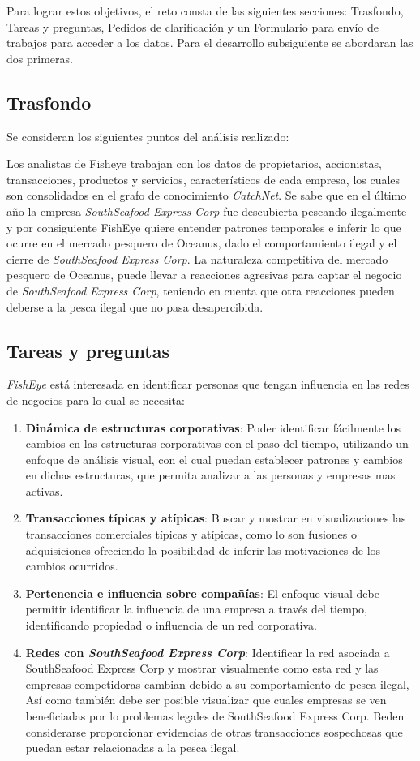 \documentclass[11pt,spanish,a4paper]{article}
\begin{document}
Para lograr estos objetivos, el reto consta de las siguientes secciones: Trasfondo, Tareas y preguntas, Pedidos de clarificación y un Formulario para envío de trabajos para acceder a los datos. Para el desarrollo subsiguiente se abordaran las dos primeras.

\subsection{Trasfondo}
Se consideran los siguientes puntos del análisis realizado:

Los analistas de Fisheye trabajan con los datos de propietarios, accionistas, transacciones, productos y servicios, característicos de cada empresa, los cuales son consolidados en el grafo de conocimiento \emph{CatchNet}. Se sabe que en el último año la empresa \emph{SouthSeafood Express Corp} fue descubierta pescando ilegalmente y por consiguiente FishEye quiere entender patrones temporales e inferir lo que ocurre en el mercado pesquero de Oceanus, dado el comportamiento ilegal y el cierre de \emph{SouthSeafood Express Corp}. La naturaleza competitiva del mercado pesquero de Oceanus, puede llevar a reacciones agresivas para captar el negocio de \emph{SouthSeafood Express Corp}, teniendo en cuenta que otra reacciones pueden deberse a la pesca ilegal que no pasa desapercibida.

\subsection{Tareas y preguntas}
\emph{FishEye} está interesada en identificar personas que tengan influencia en las redes de negocios para lo cual se necesita:

\begin{enumerate}
	\item \textbf{Dinámica de estructuras corporativas}:
    Poder identificar fácilmente los cambios en las estructuras corporativas con el paso del tiempo, utilizando un enfoque de análisis visual, con el cual puedan establecer patrones y cambios en dichas estructuras, que permita analizar a las personas y empresas mas activas.
	\item \textbf{Transacciones típicas y atípicas}:
    Buscar y mostrar en visualizaciones las transacciones comerciales típicas y atípicas, como lo son fusiones o adquisiciones ofreciendo la posibilidad de inferir las motivaciones de los cambios ocurridos.
	\item \textbf{Pertenencia e influencia sobre compañías}:
    El enfoque visual debe permitir identificar la influencia de una empresa a través del tiempo, identificando propiedad o influencia de un red corporativa.
	\item \textbf{Redes con \emph{SouthSeafood Express Corp}}:
    Identificar la red asociada a SouthSeafood Express Corp y mostrar visualmente como esta red y las empresas competidoras cambian debido a su comportamiento de pesca ilegal, Así como también debe ser posible visualizar que cuales empresas se ven beneficiadas por lo problemas legales de SouthSeafood Express Corp. Beden considerarse proporcionar evidencias de otras transacciones sospechosas que puedan estar relacionadas a la pesca ilegal.
\end{enumerate}
\end{document}
